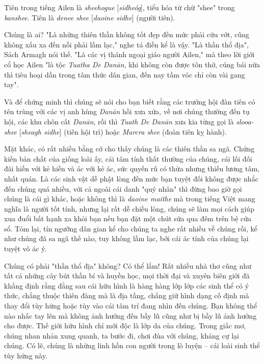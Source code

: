 Tiên trong tiếng Ailen là \textit{sheehogue} [\textit{sidheóg}], tiểu hóa từ chữ "shee" trong \textit{banshee}. Tiên là \textit{denee shee} [\textit{daoine sidhe}] (người tiên).

Chúng là ai? "Là những thiên thần không tốt đẹp đến mức phải cứu vớt, cũng không xấu xa đến nỗi phải lầm lạc," nghe tá điền kể là vậy. "Là thần thổ địa", Sách Armagh nói thế. "Là các vị thánh ngoại giáo người Ailen," mà theo lời giới cổ học Ailen "là tộc \textit{Tuatha De Danān}, khi không còn được tôn thờ, cúng bái nữa thì tiêu hoại dần trong tâm thức dân gian, đến nay tầm vóc chỉ còn vài gang tay".

Và để chứng minh thì chúng sẽ nói cho bạn biết rằng các trưởng hội đàn tiên có tên trùng với các vị anh hùng \textit{Danān} hồi xưa xửa, về nơi chúng thường đến tụ hội, các khu chôn cất \textit{Danān}, rồi thì \textit{Tuath De Danān} xưa kia từng gọi là \textit{slooa-shee} [\textit{sheagh sidhe}] (tiên hội trì) hoặc \textit{Marcra shee} (đoàn tiên kỵ hành).

Mặt khác, có rất nhiều bằng cớ cho thấy chúng là các thiên thần sa ngã. Chứng kiến bản chất của giống loài ấy, cái tâm tính thất thường của chúng, cái lối đối đãi hiền với kẻ hiền và ác với kẻ ác, sức quyến rũ có thừa nhưng thiếu lương tâm, nhất quán. Là các sinh vật dễ phật lòng đến mức bạn tuyệt đối không được nhắc đến chúng quá nhiều, với cả ngoài cái danh "quý nhân" thì đừng bao giờ gọi chúng là cái gì khác, hoặc không thì là \textit{daoine maithe} mà trong tiếng Việt mang nghĩa là người tốt tính, nhưng lại rất dễ chiều lòng, chúng sẽ làm mọi cách giúp xua đuổi bất hạnh xa khỏi bạn nếu bạn đặt một chút sữa qua đêm trên bệ cửa sổ. Tóm lại, tín ngưỡng dân gian kể cho chúng ta nghe rất nhiều về chúng rồi, kể như chúng đã sa ngã thế nào, tuy không lầm lạc, bởi cái ác tính của chúng lại tuyệt vô ác ý.

Chúng có phải "thần thổ địa" không? Có thể lắm! Rất nhiều nhà thơ cũng như tất cả những cây bút thần bí và huyền học, mọi thời đại và xuyên biên giới đã khẳng định rằng đằng sau cái hữu hình là hàng hàng lớp lớp các sinh thể có ý thức, chẳng thuộc thiên đàng mà là địa tầng, chẳng giữ hình dạng cố định mà thay đổi tùy hứng hoặc tùy vào cái tâm trí đang nhìn đến chúng. Bạn không thể nào nhấc tay lên mà không ảnh hưởng đến bầy lũ cũng như bị bầy lũ ảnh hưởng cho được. Thế giới hữu hình chỉ mới độc là lớp da của chúng. Trong giấc mơ, chúng nhan nhản xung quanh, ta bước đi, chơi đùa với chúng, kháng cự lại chúng. Có lẽ, chúng là những linh hồn con người trong lò luyện – cái loài sinh thể tùy hứng này.


